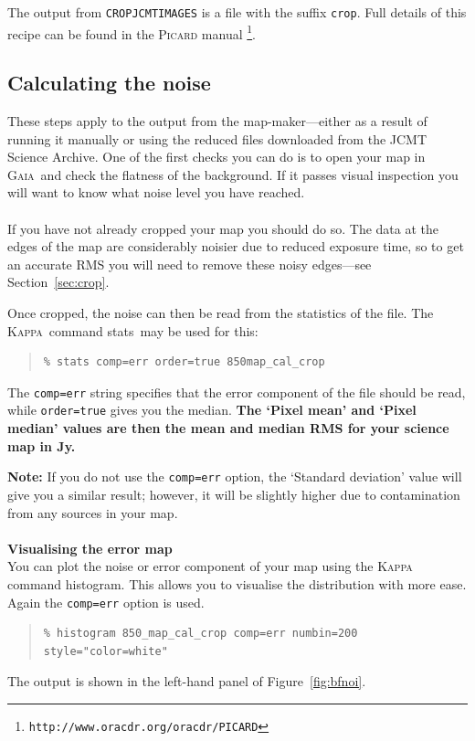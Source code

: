 \documentclass[twoside,11pt]{article}
\newcommand{\htmladdnormallink}[2]{#1}
\newcommand{\htmlref}[2]{#1}
\newcommand{\latex}[1]{#1}
\newcommand{\latexhtml}[2]{#1}
\newcommand{\xref}[3]{#1}
\newcommand{\xlabel}[1]{}
\renewcommand{\_}{\texttt{\symbol{95}}}
\newenvironment{myquote}{\begin{quote}\begin{small}}{\end{small}\end{quote}}
\newcommand{\gaia}{\xref{\textsc{Gaia}}{sun214}{}}
\newcommand{\Kappa}{\xref{\textsc{Kappa}}{sun95}{}}
\newcommand{\drrecipe}[1]{\texttt{#1}}
\newcommand{\task}[1]{\textsf{#1}}
\newcommand{\param}[1]{\texttt{#1}}
\newcommand{\histogram}{\xref{\task{histogram}}{sun95}{HISTOGRAM}}
\newcommand{\stats}{\xref{\task{stats}}{sun95}{STATS}}
\newcommand{\cref}[3]{\latexhtml{#1~\ref{#2}}{\htmlref{#3}{#2}}}
\begin{document}
The output from \drrecipe{CROP\_JCMT\_IMAGES} is a file with the suffix
\texttt{\_crop}. Full details of this recipe can be found in the
\htmladdnormallink{\textsc{Picard} manual}{http://www.oracdr.org/oracdr/PICARD}
\latex{\footnote{\texttt{http://www.oracdr.org/oracdr/PICARD}}}.

\subsection{\xlabel{noise}Calculating the noise}

These steps apply to the output from the map-maker---either as a
result of running it manually or using the reduced files downloaded
from the \htmladdnormallink{JCMT Science
Archive.}{http://www3.cadc-ccda.hia-iha.nrc-cnrc.gc.ca/jcmt/} One of
the first checks you can do is to open your map in \gaia\ and check
the flatness of the background. If it passes visual inspection you
will want to know what noise level you have reached.
\\ \\
If you have not already cropped your map you should do so. The data at
the edges of the map are considerably noisier due to reduced exposure
time, so to get an accurate RMS you will need to remove these noisy
edges---see \cref{Section}{sec:crop}{Cropping your map}.

Once cropped, the noise can then be read from the statistics of the
file. The \Kappa\ command \stats\ may be used for this:
\begin{myquote}
\begin{verbatim}
% stats comp=err order=true 850map_cal_crop
\end{verbatim}
\end{myquote}
The \param{comp=err} string specifies that the error component of the
file should be read, while \param{order=true} gives you the median.
\textbf{The `Pixel mean' and `Pixel median' values are then the mean
and median RMS for your science map in Jy.}

\textbf{Note:} If you do not use the \param{comp=err} option, the `Standard
deviation' value will give you a similar result; however, it will be
slightly higher due to contamination from any sources in your map.
\\ \\
\textbf{Visualising the error map}\\
You can plot the noise or error component of your map using the
\textsc{Kappa} command \histogram. This allows you to visualise the
distribution with more ease. Again the \param{comp=err} option is
used.
\begin{myquote}
\begin{verbatim}
% histogram 850_map_cal_crop comp=err numbin=200 style="color=white"
\end{verbatim}
\end{myquote}
The output is shown in the left-hand panel of \cref{Figure}{fig:bfnoi}{the
graphics below}.
\end{document}
